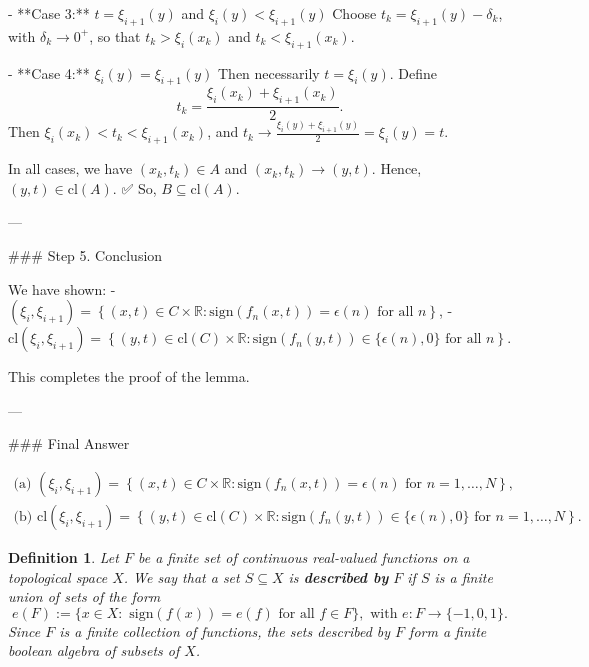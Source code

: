 \documentclass[12pt]{article}
\theoremstyle{mythm}
\let\oldendproof\endproof
\renewenvironment{proof}[1][\proofname]{%
  \oldproof[\normalfont \bfseries \sffamily #1]%
}{\oldendproof}
\renewcommand*{\proofname}{Proof}
\renewcommand*{\proofname}{Proof}
\renewcommand*{\proofname}{Proof}
\renewcommand*{\proofname}{Proof}
\renewcommand*{\proofname}{Proof}
\newtheorem{definition}{Definition}[section]
\renewcommand*{\proofname}{Proof}
\renewcommand*{\proofname}{Proof}
\begin{document}
\begin{proof}
- **Case 3:** \( t = \xi_{i+1}(y) \) and \( \xi_i(y) < \xi_{i+1}(y) \)  
  Choose \( t_k = \xi_{i+1}(y) - \delta_k \), with \( \delta_k \to 0^+ \), so that \( t_k > \xi_i(x_k) \) and \( t_k < \xi_{i+1}(x_k) \).

- **Case 4:** \( \xi_i(y) = \xi_{i+1}(y) \)  
  Then necessarily \( t = \xi_i(y) \). Define  
  \[
  t_k = \frac{\xi_i(x_k) + \xi_{i+1}(x_k)}{2}.
  \]  
  Then \( \xi_i(x_k) < t_k < \xi_{i+1}(x_k) \), and \( t_k \to \frac{\xi_i(y) + \xi_{i+1}(y)}{2} = \xi_i(y) = t \).

In all cases, we have \( (x_k, t_k) \in A \) and \( (x_k, t_k) \to (y, t) \). Hence, \( (y, t) \in \mathrm{cl}(A) \).  
✅ So, \( B \subseteq \mathrm{cl}(A) \).

---

### Step 5. Conclusion

We have shown:
- \( (\xi_i, \xi_{i+1}) = \left\{ (x, t) \in C \times \mathbb{R} : \mathrm{sign}(f_n(x, t)) = \epsilon(n) \text{ for all } n \right\} \),
- \( \mathrm{cl}(\xi_i, \xi_{i+1}) = \left\{ (y, t) \in \mathrm{cl}(C) \times \mathbb{R} : \mathrm{sign}(f_n(y, t)) \in \{\epsilon(n), 0\} \text{ for all } n \right\} \).

This completes the proof of the lemma.

---

### Final Answer

\[
\boxed{
\begin{array}{l}
\text{(a) } (\xi_i, \xi_{i+1}) = \left\{ (x, t) \in C \times \mathbb{R} : \mathrm{sign}(f_n(x, t)) = \epsilon(n) \text{ for } n = 1, \ldots, N \right\}, \\
\text{(b) } \mathrm{cl}(\xi_i, \xi_{i+1}) = \left\{ (y, t) \in \mathrm{cl}(C) \times \mathbb{R} : \mathrm{sign}(f_n(y, t)) \in \{\epsilon(n), 0\} \text{ for } n = 1, \ldots, N \right\}.
\end{array}
}
\]
\end{proof}

\begin{definition}
Let \( F \) be a finite set of continuous real-valued functions on a topological space \( X \). We say that a set \( S \subseteq X \) is \textbf{described by} \( F \) if \( S \) is a finite union of sets of the form  
\[e(F) := \{x \in X : \text{ sign}(f(x)) = e(f) \text{ for all } f \in F\}, \text{ with } e: F \to \{-1, 0, 1\}.\]  
Since \( F \) is a finite collection of functions, the sets described by \( F \) form a finite boolean algebra of subsets of \( X \).
\end{definition}
\end{document}

